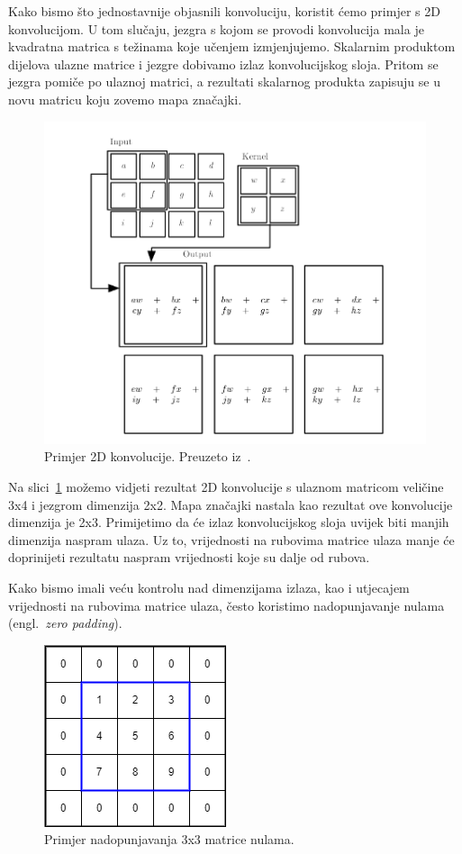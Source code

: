 \documentclass[times, utf8, zavrsni, numeric]{fer}
\begin{document}
Kako bismo što jednostavnije objasnili konvoluciju, koristit ćemo primjer s 2D konvolucijom.
U tom slučaju, jezgra s kojom se provodi konvolucija mala je kvadratna matrica s težinama koje učenjem izmjenjujemo. Skalarnim produktom dijelova ulazne matrice i jezgre dobivamo izlaz konvolucijskog sloja.
Pritom se jezgra pomiče po ulaznoj matrici, a rezultati skalarnog produkta zapisuju se u novu matricu koju zovemo mapa značajki.

\pagebreak
\begin{figure}[htb]
    \centering
    \includegraphics[scale=0.5]{convolution.png}
    \caption{Primjer 2D konvolucije. Preuzeto iz~\cite{Goodfellow-et-al-2016}.}
    \label{fig:convolution}
\end{figure}

Na slici~\ref{fig:convolution} možemo vidjeti rezultat 2D konvolucije s ulaznom matricom veličine 3x4 i jezgrom dimenzija 2x2. 
Mapa značajki nastala kao rezultat ove konvolucije dimenzija je 2x3. Primijetimo da će izlaz konvolucijskog sloja uvijek biti manjih dimenzija naspram ulaza.
Uz to, vrijednosti na rubovima matrice ulaza manje će doprinijeti rezultatu naspram vrijednosti koje su dalje od rubova.

Kako bismo imali veću kontrolu nad dimenzijama izlaza, kao i utjecajem vrijednosti na rubovima matrice ulaza, često koristimo nadopunjavanje nulama (engl.\ \textit{zero padding}).

\begin{figure}[htb]
    \centering
    \includegraphics[scale=0.5]{zero_padding.png}
    \caption{Primjer nadopunjavanja 3x3 matrice nulama.}
    \label{fig:zero_padding}
\end{figure}
\end{document}
